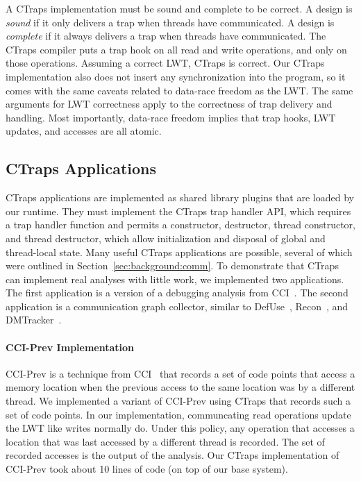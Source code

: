 \documentclass[preprint,9pt]{sigplanconf}
\newcommand{\ctraps}{CTraps\xspace}
\newcommand{\lwt}{LWT\xspace}
\begin{document}
A \ctraps implementation must be sound and complete to be correct.  A design is
{\em sound} if it only delivers a trap when threads have communicated.  A
design is {\em complete} if it always delivers a trap when threads have
communicated.  The \ctraps compiler puts a trap hook on all read and write
operations, and only on those operations.  Assuming a correct \lwt, \ctraps is
correct.  Our \ctraps implementation also does not insert any synchronization
into the program, so it comes with the same caveats related to data-race
freedom as the \lwt.  The same arguments for \lwt correctness apply to the
correctness of trap delivery and handling.  Most importantly, data-race freedom
implies that trap hooks, \lwt updates, and accesses are all atomic.




\subsection{\ctraps Applications}
\label{sec:apps}
\ctraps applications are implemented as shared library plugins that are loaded
by our runtime.  They must implement the \ctraps trap handler API, which
requires a trap handler function and permits a constructor, destructor, thread
constructor, and thread destructor, which allow initialization and disposal of
global and thread-local state.  Many useful \ctraps applications are possible,
several of which were outlined in Section~\ref{sec:background:comm}.    To
demonstrate that \ctraps can implement real analyses with little work, we
implemented two applications. The first application is a version of a debugging
analysis from CCI~\cite{cci}.  The second application is a communication graph
collector, similar to DefUse~\cite{defuse}, Recon~\cite{recon}, and
DMTracker~\cite{dmtracker}.

\paragraph{CCI-Prev Implementation}
CCI-Prev is a technique from CCI~\cite{cci} that records a set of code points
that access a memory location when the previous access to the same location was
by a different thread.  We implemented a variant of CCI-Prev using \ctraps that
records such a set of code points.  In our implementation, communcating read
operations update the LWT like writes normally do.  Under this policy, any
operation that accesses a location that was last accessed by a different thread
is recorded.  The set of recorded accesses is the output of the analysis.  Our
\ctraps implementation of CCI-Prev took about 10 lines of code (on top of our
base system). 
\end{document}
